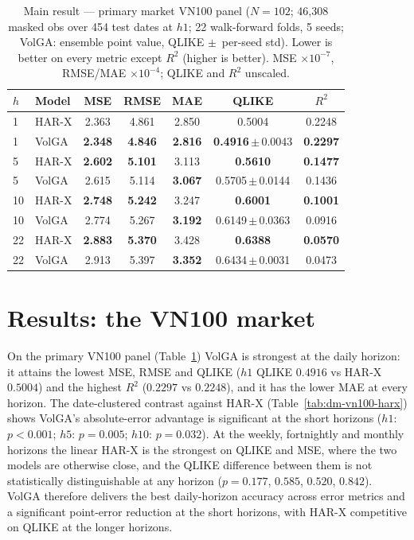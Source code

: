 \documentclass[runningheads]{llncs}
\begin{document}
\begin{table}[t]
\centering
\caption{Main result --- primary market VN100 panel ($N=102$; 46{,}308 masked obs over 454 test dates
at $h1$; 22 walk-forward folds, 5 seeds; VolGA: ensemble point value, QLIKE $\pm$~per-seed std). Lower
is better on every metric except $R^2$ (higher is better). MSE $\times10^{-7}$, RMSE/MAE
$\times10^{-4}$; QLIKE and $R^2$ unscaled.}
\label{tab:vn100main}
\footnotesize
\setlength{\tabcolsep}{6pt}
\begin{tabular}{llccccc}
\toprule
$h$ & Model & MSE & RMSE & MAE & QLIKE & $R^2$ \\
\midrule
1 & HAR-X & 2.363 & 4.861 & 2.850 & 0.5004 & 0.2248 \\
1 & VolGA & \textbf{2.348} & \textbf{4.846} & \textbf{2.816} & \textbf{0.4916}\,$\pm$\,0.0043 & \textbf{0.2297} \\
\midrule
5 & HAR-X & \textbf{2.602} & \textbf{5.101} & 3.113 & \textbf{0.5610} & \textbf{0.1477} \\
5 & VolGA & 2.615 & 5.114 & \textbf{3.067} & 0.5705\,$\pm$\,0.0144 & 0.1436 \\
\midrule
10 & HAR-X & \textbf{2.748} & \textbf{5.242} & 3.247 & \textbf{0.6001} & \textbf{0.1001} \\
10 & VolGA & 2.774 & 5.267 & \textbf{3.192} & 0.6149\,$\pm$\,0.0363 & 0.0916 \\
\midrule
22 & HAR-X & \textbf{2.883} & \textbf{5.370} & 3.428 & \textbf{0.6388} & \textbf{0.0570} \\
22 & VolGA & 2.913 & 5.397 & \textbf{3.352} & 0.6434\,$\pm$\,0.0031 & 0.0473 \\
\bottomrule
\end{tabular}
\end{table}

\section{Results: the VN100 market}\label{sec:results}
On the primary VN100 panel (Table~\ref{tab:vn100main}) VolGA is strongest at the daily horizon: it
attains the lowest MSE, RMSE and QLIKE ($h1$ QLIKE $0.4916$ vs HAR-X $0.5004$) and the highest $R^2$
($0.2297$ vs $0.2248$), and it has the lower MAE at every horizon. The date-clustered contrast against
HAR-X (Table~\ref{tab:dm-vn100-harx}) shows VolGA's absolute-error advantage is significant at the
short horizons ($h1$: $p<0.001$; $h5$: $p=0.005$; $h10$: $p=0.032$). At the weekly, fortnightly and
monthly horizons the linear HAR-X is the strongest on QLIKE and MSE, where the two models are
otherwise close, and the QLIKE difference between them is not statistically distinguishable at any
horizon ($p=0.177$, $0.585$, $0.520$, $0.842$). VolGA therefore delivers the best daily-horizon
accuracy across error metrics and a significant point-error reduction at the short horizons, with
HAR-X competitive on QLIKE at the longer horizons.
\end{document}
